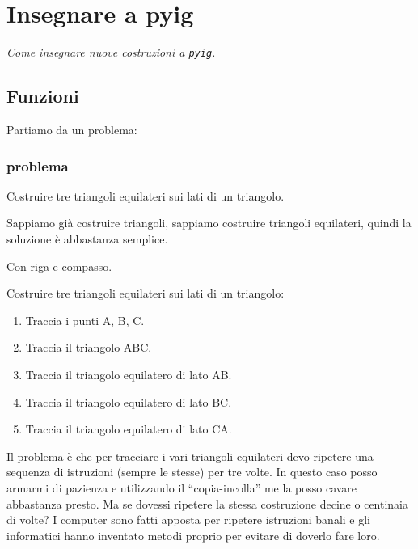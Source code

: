 \section{Insegnare a pyig}
\label{sec:geo_int_insegnare}

\emph{Come insegnare nuove costruzioni a \lstinline{pyig}.}

\subsection{Funzioni}
\label{subsec:geo_int_funzioni}

Partiamo da un problema:

\subsubsection{problema}

Costruire tre triangoli equilateri sui lati di un triangolo.

Sappiamo già costruire triangoli, sappiamo costruire triangoli equilateri, 
quindi la soluzione è abbastanza semplice.

Con riga e compasso.

\begin{procedura}\label{proc:geoint2_}
  Costruire tre triangoli equilateri sui lati di un triangolo:
  \begin{enumerate} [nosep]
    \item 
    Traccia i punti A, B, C.
    \item 
    Traccia il triangolo ABC.
    \item 
    Traccia il triangolo equilatero di lato AB.
    \item 
    Traccia il triangolo equilatero di lato BC.
    \item 
    Traccia il triangolo equilatero di lato CA.  
  \end{enumerate}
\end{procedura}

Il problema è che per tracciare i vari triangoli equilateri devo ripetere una 
sequenza di istruzioni (sempre le stesse) per tre volte. In questo caso posso 
armarmi di pazienza e utilizzando il ``copia-incolla'' me la posso cavare 
abbastanza presto. Ma se dovessi ripetere la stessa costruzione decine o 
centinaia di volte? I computer sono fatti apposta per ripetere istruzioni 
banali e gli informatici hanno inventato metodi proprio per evitare di doverlo 
fare loro.

